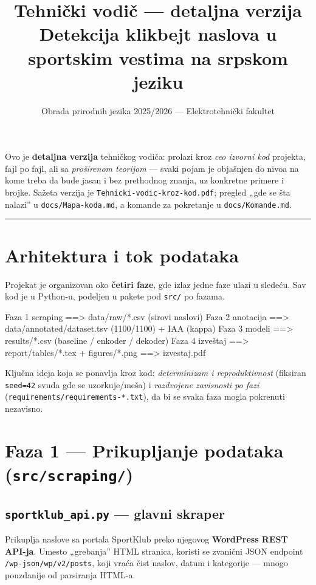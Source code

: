 \documentclass[11pt,a4paper]{article}
\title{\textbf{Tehnički vodič --- detaljna verzija}\\[2pt]
\large Detekcija klikbejt naslova u sportskim vestima na srpskom jeziku}
\author{Obrada prirodnih jezika 2025/2026 --- Elektrotehnički fakultet}
\date{}
\newcommand{\kod}[1]{\texttt{#1}}
\begin{document}
\maketitle

\noindent
Ovo je \textbf{detaljna verzija} tehničkog vodiča: prolazi kroz \emph{ceo izvorni kod}
projekta, fajl po fajl, ali sa \emph{proširenom teorijom} --- svaki pojam je objašnjen
do nivoa na kome treba da bude jasan i bez prethodnog znanja, uz konkretne primere i
brojke. Sažeta verzija je \texttt{Tehnicki-vodic-kroz-kod.pdf}; pregled „gde se šta
nalazi'' u \texttt{docs/Mapa-koda.md}, a komande za pokretanje u
\texttt{docs/Komande.md}.

\tableofcontents
\vspace{4mm}\hrule

\section{Arhitektura i tok podataka}
Projekat je organizovan oko \textbf{četiri faze}, gde izlaz jedne faze ulazi u
sledeću. Sav kod je u Python-u, podeljen u pakete pod \kod{src/} po fazama.

\begin{code}
Faza 1  scraping        ==>  data/raw/*.csv            (sirovi naslovi)
Faza 2  anotacija       ==>  data/annotated/dataset.tsv (1100/1100) + IAA (kappa)
Faza 3  modeli          ==>  results/*.csv             (baseline / enkoder / dekoder)
Faza 4  izveštaj        ==>  report/tables/*.tex + figures/*.png ==> izvestaj.pdf
\end{code}

\noindent
Ključna ideja koja se ponavlja kroz kod: \emph{determinizam i reproduktivnost}
(fiksiran \kod{seed=42} svuda gde se uzorkuje/meša) i \emph{razdvojene zavisnosti po
fazi} (\kod{requirements/requirements-*.txt}), da bi se svaka faza mogla pokrenuti
nezavisno.

\section{Faza 1 --- Prikupljanje podataka (\texttt{src/scraping/})}

\subsection{\texttt{sportklub\_api.py} --- glavni skraper}
Prikuplja naslove sa portala SportKlub preko njegovog \textbf{WordPress REST API-ja}.
Umesto „grebanja'' HTML stranica, koristi se zvanični JSON endpoint
\kod{/wp-json/wp/v2/posts}, koji vraća čist naslov, datum i kategorije --- mnogo
pouzdanije od parsiranja HTML-a.
\end{document}
